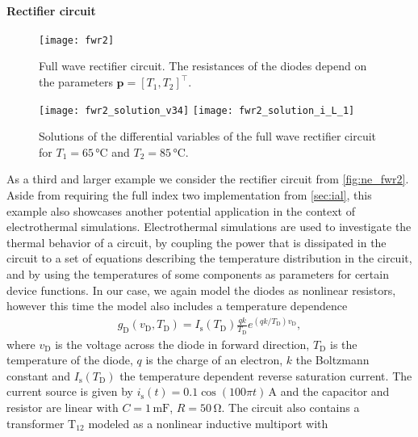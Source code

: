 \documentclass[AMA,STIX1COL]{WileyNJD-v2}
\newcommand{\mb}[1]{\mathbf{#1}}
\newcommand{\mr}[1]{\mathrm{#1}}
\newcommand{\T}{{\!\top}}
\begin{document}
\paragraph{Rectifier circuit}
\begin{figure}[t]
    \begin{center}
        \texttt{[image: fwr2]}
    \end{center}
    \caption{Full wave rectifier circuit. The resistances of the diodes depend on the parameters $\mb{p} = [T_1, T_2]^\T$.}
    \label{fig:ne_fwr2}
\end{figure}

\begin{figure}[b]
    \begin{center}
        \texttt{[image: fwr2\_solution\_v34]} \hspace{1.5cm} \texttt{[image: fwr2\_solution\_i\_L\_1]}
    \end{center}
    \caption{Solutions of the differential variables of the full wave rectifier circuit for $T_1 = 65\, \si{\celsius}$ and $T_2 = 85\, \si{\celsius}$.}
    \label{fig:ne_fwr2_solution_d}
\end{figure}
As a third and larger example we consider the rectifier circuit from \autoref{fig:ne_fwr2}. Aside from requiring the full index two implementation from \autoref{sec:ial}, this example also showcases another potential application in the context of electrothermal simulations. Electrothermal simulations are used to investigate the thermal behavior of a circuit, by coupling the power that is dissipated in the circuit to a set of equations describing the temperature distribution in the circuit, and by using the temperatures of some components as parameters for certain device functions. In our case, we again model the diodes as nonlinear resistors, however this time the model also includes a temperature dependence\cite{tietze2008}
\begin{align*}
    g_\mr{D}(v_\mr{D}, T_\mr{D}) = I_\mr{s}(T_\mr{D}) \frac{qk}{T_\mr{D}} e^{(qk/T_\mr{D}) v_\mr{D}},
\end{align*}
where $v_\mr{D}$ is the voltage across the diode in forward direction, $T_\mr{D}$ is the temperature of the diode, $q$ is the charge of an electron, $k$ the Boltzmann constant and $I_\mr{s}(T_\mr{D})$ the temperature dependent reverse saturation current\cite{tietze2008}. The current source is given by $i_\mr{s}(t) = 0.1 \cos(100 \pi t)\, \si{\ampere}$ and the capacitor and resistor are linear with $C = 1\, \si{\milli\farad}$, $R = 50\, \si{\ohm}$. The circuit also contains a transformer $\mr{T}_{12}$ modeled as a nonlinear inductive multiport with
\end{document}
